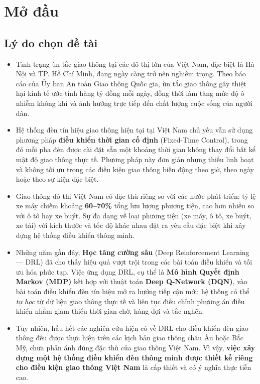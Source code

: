 \section{Mở đầu}

\subsection{Lý do chọn đề tài}

\begin{itemize}
    \item Tình trạng ùn tắc giao thông tại các đô thị lớn của Việt Nam, đặc biệt là Hà Nội và TP. Hồ Chí Minh, đang ngày càng trở nên nghiêm trọng. Theo báo cáo của Ủy ban An toàn Giao thông Quốc gia, ùn tắc giao thông gây thiệt hại kinh tế ước tính hàng tỷ đồng mỗi ngày, đồng thời làm tăng mức độ ô nhiễm không khí và ảnh hưởng trực tiếp đến chất lượng cuộc sống của người dân.

    \item Hệ thống đèn tín hiệu giao thông hiện tại tại Việt Nam chủ yếu vẫn sử dụng phương pháp \textbf{điều khiển thời gian cố định} (Fixed-Time Control), trong đó mỗi pha đèn được cài đặt sẵn một khoảng thời gian không thay đổi bất kể mật độ giao thông thực tế. Phương pháp này đơn giản nhưng thiếu linh hoạt và không tối ưu trong các điều kiện giao thông biến động theo giờ, theo ngày hoặc theo sự kiện đặc biệt.

    \item Giao thông đô thị Việt Nam có đặc thù riêng so với các nước phát triển: tỷ lệ xe máy chiếm khoảng \textbf{60--70\%} tổng lưu lượng phương tiện, cao hơn nhiều so với ô tô hay xe buýt. Sự đa dạng về loại phương tiện (xe máy, ô tô, xe buýt, xe tải) với kích thước và tốc độ khác nhau đặt ra yêu cầu đặc biệt khi xây dựng hệ thống điều khiển thông minh.

    \item Những năm gần đây, \textbf{Học tăng cường sâu} (Deep Reinforcement Learning --- DRL) đã cho thấy hiệu quả vượt trội trong các bài toán điều khiển và tối ưu hóa phức tạp. Việc ứng dụng DRL, cụ thể là \textbf{Mô hình Quyết định Markov (MDP)} kết hợp với thuật toán \textbf{Deep Q-Network (DQN)}, vào bài toán điều khiển đèn tín hiệu mở ra hướng tiếp cận mới: hệ thống có thể \textit{tự học} từ dữ liệu giao thông thực tế và liên tục điều chỉnh phương án điều khiển nhằm giảm thiểu thời gian chờ, hàng đợi và tắc nghẽn.

    \item Tuy nhiên, hầu hết các nghiên cứu hiện có về DRL cho điều khiển đèn giao thông đều được thực hiện trên các kịch bản giao thông châu Âu hoặc Bắc Mỹ, chưa phản ánh đúng đặc thù của giao thông Việt Nam. Vì vậy, \textbf{việc xây dựng một hệ thống điều khiển đèn thông minh được thiết kế riêng cho điều kiện giao thông Việt Nam} là cấp thiết và có ý nghĩa thực tiễn cao.
\end{itemize}

